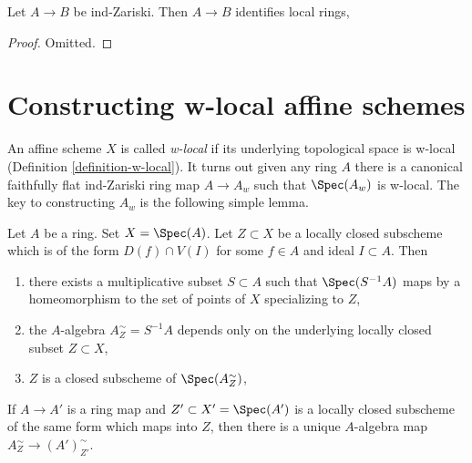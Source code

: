 \begin{lemma}
\label{lemma-ind-zariski-implies}
Let $A \to B$ be ind-Zariski. Then $A \to B$ identifies local rings,
\end{lemma}

\begin{proof}
Omitted.
\end{proof}







\section{Constructing w-local affine schemes}
\label{section-construction}

\noindent
An affine scheme $X$ is called {\it w-local} if its underlying
topological space is w-local (Definition \ref{definition-w-local}).
It turns out given any ring $A$ there is a canonical faithfully
flat ind-Zariski ring map $A \to A_w$ such that $\Spec(A_w)$ is
w-local. The key to constructing $A_w$ is the following simple lemma.

\begin{lemma}
\label{lemma-localization}
Let $A$ be a ring. Set $X = \Spec(A)$. Let $Z \subset X$ be a locally closed
subscheme which is of the form $D(f) \cap V(I)$ for some $f \in A$ and
ideal $I \subset A$. Then
\begin{enumerate}
\item there exists a multiplicative subset $S \subset A$ such that
$\Spec(S^{-1}A)$ maps by a homeomorphism to the set of points of $X$
specializing to $Z$,
\item the $A$-algebra $A_Z^\sim = S^{-1}A$ depends only on
the underlying locally closed subset $Z \subset X$,
\item $Z$ is a closed subscheme of $\Spec(A_Z^\sim)$,
\end{enumerate}
If $A \to A'$ is a ring map and $Z' \subset X' = \Spec(A')$ is a
locally closed subscheme of the same form which maps into $Z$,
then there is a unique $A$-algebra map
$A_Z^\sim \to (A')_{Z'}^\sim$.
\end{lemma}

